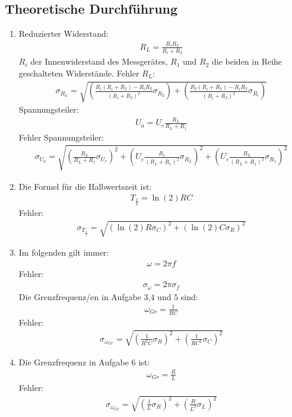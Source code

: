 \documentclass[12pt]{scrartcl}
\begin{document}
\subsection{Theoretische Durchführung}
\begin{enumerate}
\item
Reduzierter Widerstand:
\begin{align}
R_L = \frac{R_i R_2}{R_i + R_2}
\end{align}
$R_i$ der Innenwiderstand des Messgerätes,
$R_1$ und $R_2$ die beiden in Reihe geschalteten Widerstände.
Fehler $R_L$:
\begin{align}
\sigma_{R_L} = \sqrt{
\left(\frac{R_i(R_i+R_2)-R_i R_2}{(R_i + R_2)^2}\sigma_{R_2}\right)+
\left(\frac{R_2(R_i+R_2)-R_i R_2}{(R_i + R_2)^2}\sigma_{R_i}\right)}
\end{align}
Spannungsteiler:
\begin{align}
U_a = U_e \frac{R_L}{R_L + R_1}
\end{align}
Fehler Spannungsteiler:
\begin{align}
\sigma_{U_a} = \sqrt{
\left(\frac{R_L}{R_L + R_1}\sigma_{U_e}\right)^2+
\left(U_e \frac{R_1}{(R_L + R_1)^2}\sigma_{R_L}\right)^2+
\left(U_e \frac{R_L}{(R_L + R_1)^2}\sigma_{R_1}\right)^2}
\end{align}
\item
Die Formel für die Halbwertszeit ist:
\begin{align}
T_{\frac{1}{2}} = \ln(2)RC
\end{align}
Fehler:
\begin{align}
\sigma_{T_{\frac{1}{2}}} = \sqrt{
\left(\ln(2)R\sigma_{C}\right)^2+
\left(\ln(2)C\sigma_{R}\right)^2}
\end{align}
\item
Im folgenden gilt immer:
\begin{align}
\omega = 2\pi f
\end{align}
Fehler:
\begin{align}
\sigma_{\omega} = 2\pi\sigma_f
\end{align}
Die Grenzfrequenz/en in Aufgabe 3,4 und 5 sind:
\begin{align}
\omega_{Gr} = \frac{1}{RC}
\end{align}
Fehler:
\begin{align}
\sigma_{\omega_{Gr}} = \sqrt{
\left(\frac{1}{R^2C}\sigma_R\right)^2+
\left(\frac{1}{RC^2}\sigma_C\right)^2}
\end{align}
\item
Die Grenzfrequenz in Aufgabe 6 ist:
\begin{align}
\omega_{Gr} = \frac{R}{L}
\end{align}
Fehler:
\begin{align}
\sigma_{\omega_{Gr}} = \sqrt{\left(\frac{1}{L}\sigma_R\right)^2+\left(\frac{R}{L^2}\sigma_L\right)^2}
\end{align}

\end{enumerate}
\end{document}

